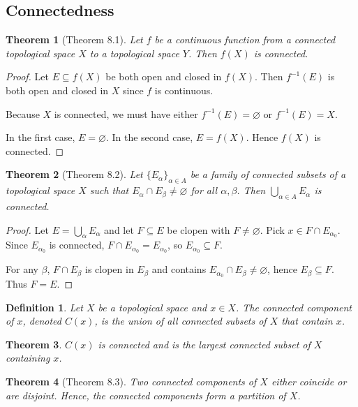 \documentclass[12pt]{article}
\newtheorem{theorem}{Theorem}
\newtheorem{definition}{Definition}
\begin{document}
\subsection*{Connectedness}

\begin{theorem}[Theorem 8.1]
Let $f$ be a continuous function from a connected topological space $X$ to a topological space $Y$. Then $f(X)$ is connected.
\end{theorem}

\begin{proof}
Let $E \subseteq f(X)$ be both open and closed in $f(X)$. Then $f^{-1}(E)$ is both open and closed in $X$ since $f$ is continuous. 

Because $X$ is connected, we must have either $f^{-1}(E) = \varnothing$ or $f^{-1}(E) = X$. 

In the first case, $E = \varnothing$. In the second case, $E = f(X)$. Hence $f(X)$ is connected.
\end{proof}

\begin{theorem}[Theorem 8.2]
Let $\{E_\alpha\}_{\alpha \in A}$ be a family of connected subsets of a topological space $X$ such that 
$E_\alpha \cap E_\beta \neq \varnothing$ for all $\alpha,\beta$. Then $\bigcup_{\alpha \in A} E_\alpha$ is connected.
\end{theorem}

\begin{proof}
Let $E = \bigcup_\alpha E_\alpha$ and let $F \subseteq E$ be clopen with $F \neq \varnothing$. 
Pick $x \in F \cap E_{\alpha_0}$. Since $E_{\alpha_0}$ is connected, $F \cap E_{\alpha_0} = E_{\alpha_0}$, so $E_{\alpha_0} \subseteq F$.

For any $\beta$, $F \cap E_\beta$ is clopen in $E_\beta$ and contains $E_{\alpha_0} \cap E_\beta \neq \varnothing$, hence $E_\beta \subseteq F$. 
Thus $F = E$.
\end{proof}

\begin{definition}
Let $X$ be a topological space and $x \in X$. The \emph{connected component} of $x$, denoted $C(x)$, is the union of all connected subsets of $X$ that contain $x$.
\end{definition}

\begin{theorem}
$C(x)$ is connected and is the largest connected subset of $X$ containing $x$.
\end{theorem}

\begin{theorem}[Theorem 8.3]
Two connected components of $X$ either coincide or are disjoint. Hence, the connected components form a partition of $X$.
\end{theorem}
\end{document}
